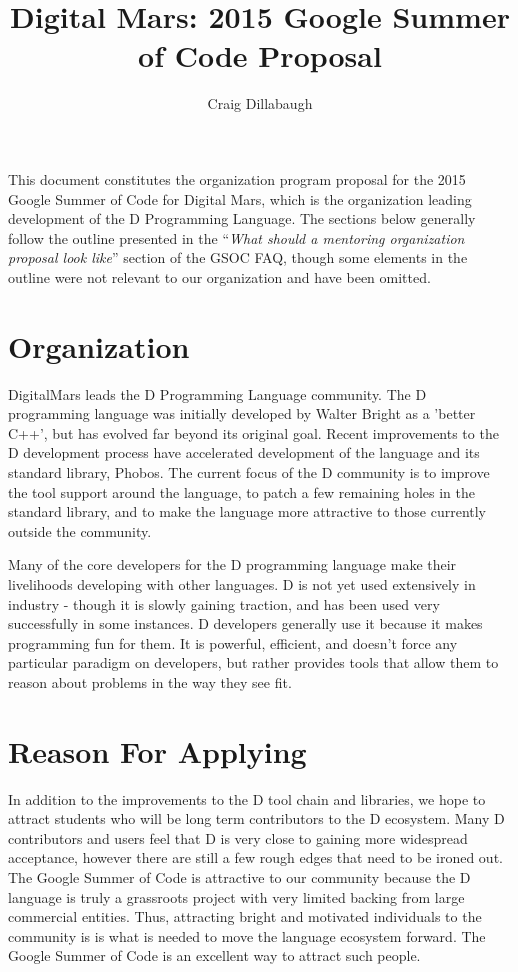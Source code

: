 \documentclass[	DIV=calc,%
							paper=a4,%
							fontsize=11pt,%
							twocolumn]{scrartcl}	 					%
\title{Digital Mars: 2015 Google Summer of Code Proposal}					%
\author{Craig Dillabaugh }											%
\date{}
\begin{document}
\maketitle

This document constitutes the organization program proposal for the
2015 Google Summer of Code for Digital Mars, which is the organization
leading development of the D Programming Language. The sections below
generally follow the outline presented in the ``\emph{What should a mentoring
organization proposal look like}'' section of the GSOC FAQ, though some 
elements in the outline were not relevant to our organization and have
been omitted.

\section{Organization}

DigitalMars leads the D Programming Language community.   The D programming
language was initially developed by Walter Bright as a 'better C++', but
has evolved far beyond its original goal.
Recent improvements to 
the D development process have accelerated development of the language and
its standard library, Phobos.
The 
current focus of the D community is to improve the tool support around the 
language, to patch a few remaining holes in the standard library, and to make 
the language more attractive to those currently outside the community.  

Many of the core developers for the D programming language make their 
livelihoods developing with other languages.  D is not yet used extensively
in industry - though it is slowly gaining traction, and has been used very 
successfully in some instances.
D developers generally use it because it makes programming fun for them.  
It is 
powerful, efficient, and doesn't force any particular paradigm on developers,
but rather provides tools that allow them to reason about problems in the way 
they see fit.


\section{Reason For Applying}

In addition to the improvements to the D tool chain and libraries, we 
hope to attract students who will be long term contributors to the D ecosystem.
Many D contributors and users feel that D is very close to gaining more
widespread acceptance, however there are still a few rough edges that
need to be ironed out. 
The Google Summer of Code is attractive to our community because the D 
language is truly a grassroots project with very limited backing from 
large commercial entities.  
Thus, attracting bright and motivated individuals to the community is
is what is needed to move the language ecosystem forward.
The Google Summer of Code is an excellent way to attract such people.
\end{document}
